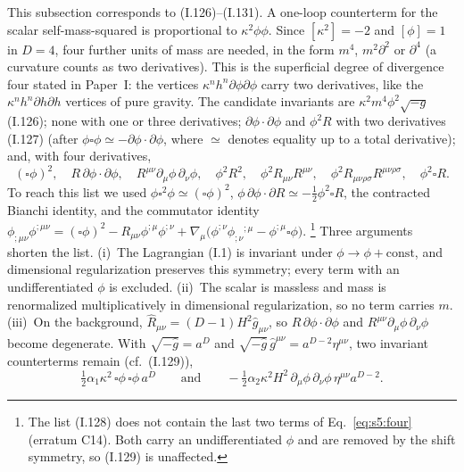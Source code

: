 \documentclass[aps,prd,onecolumn,10pt,nofootinbib,floatfix]{revtex4-2}
\newcommand{\PI}{Paper~I}
\newcommand{\eqI}[1]{(I.#1)}
\begin{document}
This subsection corresponds to \eqI{126}--\eqI{131}.
A one-loop counterterm for the scalar self-mass-squared is proportional to $\kappa^2\phi\phi$.
Since $[\kappa^2]=-2$ and $[\phi]=1$ in $D=4$, four further units of mass are needed, in the form $m^4$, $m^2\partial^2$ or $\partial^4$ (a curvature counts as two derivatives).
This is the superficial degree of divergence four stated in \PI: the vertices $\kappa^nh^n\partial\phi\partial\phi$ carry two derivatives, like the $\kappa^nh^n\partial h\partial h$ vertices of pure gravity.
The candidate invariants are $\kappa^2m^4\phi^2\sqrt{-g}$ \eqI{126}; none with one or three derivatives; $\partial\phi\cdot\partial\phi$ and $\phi^2R$ with two derivatives \eqI{127} (after $\phi\square\phi\simeq-\partial\phi\cdot\partial\phi$, where $\simeq$ denotes equality up to a total derivative); and, with four derivatives,
\begin{equation}
(\square\phi)^2,\quad R\,\partial\phi\cdot\partial\phi,\quad R^{\mu\nu}\partial_\mu\phi\,\partial_\nu\phi,\quad \phi^2R^2,\quad \phi^2R_{\mu\nu}R^{\mu\nu},\quad \phi^2R_{\mu\nu\rho\sigma}R^{\mu\nu\rho\sigma},\quad \phi^2\square R .
\label{eq:s5:four}
\end{equation}
To reach this list we used $\phi\square^2\phi\simeq(\square\phi)^2$, $\phi\,\partial\phi\cdot\partial R\simeq-\frac12\phi^2\square R$, the contracted Bianchi identity, and the commutator identity
$\phi_{;\mu\nu}\phi^{;\mu\nu}=(\square\phi)^2-R_{\mu\nu}\phi^{;\mu}\phi^{;\nu}+\nabla_\mu\big(\phi^{;\nu}\phi_{;\nu}{}^{;\mu}-\phi^{;\mu}\square\phi\big)$.%
\footnote{The list \eqI{128} does not contain the last two terms of Eq.~\eqref{eq:s5:four} (erratum C14). Both carry an undifferentiated $\phi$ and are removed by the shift symmetry, so \eqI{129} is unaffected.}
Three arguments shorten the list.
(i)~The Lagrangian \eqI{1} is invariant under $\phi\to\phi+\text{const}$, and dimensional regularization preserves this symmetry; every term with an undifferentiated $\phi$ is excluded.
(ii)~The scalar is massless and mass is renormalized multiplicatively in dimensional regularization, so no term carries $m$.
(iii)~On the background, $\hat R_{\mu\nu}=(D-1)H^2\hat g_{\mu\nu}$, so $R\,\partial\phi\cdot\partial\phi$ and $R^{\mu\nu}\partial_\mu\phi\,\partial_\nu\phi$ become degenerate.
With $\sqrt{-\hat g}=a^D$ and $\sqrt{-\hat g}\,\hat g^{\mu\nu}=a^{D-2}\eta^{\mu\nu}$, two invariant counterterms remain (cf.\ \eqI{129}),
\begin{equation}
\tfrac12\alpha_1\kappa^2\,\square\phi\,\square\phi\,a^D\qquad\text{and}\qquad-\tfrac12\alpha_2\kappa^2H^2\,\partial_\mu\phi\,\partial_\nu\phi\,\eta^{\mu\nu}a^{D-2}.
\label{eq:s5:inv}
\end{equation}
\end{document}
